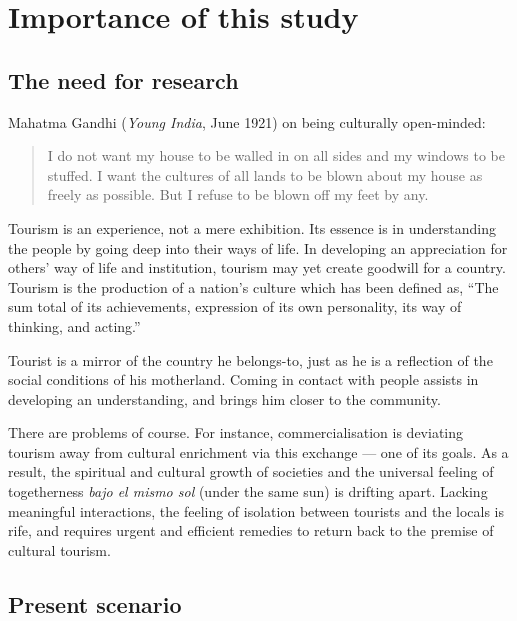 \chapter{Importance of this study} %
\label{cha:ios}

\section{The need for research} %
\label{sec:nfr}

Mahatma Gandhi (\emph{Young India}, June 1921) on being culturally open-minded:

\begin{quote}
I do not want my house to be walled in on all sides and my windows to be stuffed. I want the cultures of all lands to be blown about my house as freely as possible. But I refuse to be blown off my feet by any.
\end{quote}

Tourism is an experience, not a mere exhibition. Its essence is in understanding the people by going deep into their ways of life. In developing an appreciation for others' way of life and institution, tourism may yet create goodwill for a country. Tourism is the production of a nation's culture which has been defined as, ``The sum total of its achievements, expression of its own personality, its way of thinking, and acting.''

Tourist is a mirror of the country he belongs-to, just as he is a reflection of the social conditions of his motherland. Coming in contact with people assists in developing an understanding, and brings him closer to the community.

There are problems of course. For instance, commercialisation is deviating tourism away from cultural enrichment via this exchange --- one of its goals. As a result, the spiritual and cultural growth of societies and the universal feeling of togetherness \emph{bajo el mismo sol} (under the same sun) is drifting apart. Lacking meaningful interactions, the feeling of isolation between tourists and the locals is rife, and requires urgent and efficient remedies to return back to the premise of cultural tourism.


\section{Present scenario} %
\label{sec:psc}

